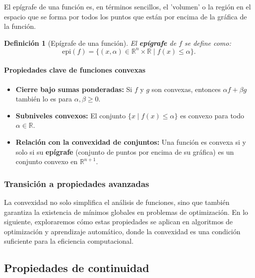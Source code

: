 \documentclass[12pt]{book}
\newtheorem{definition}{Definición}
\theoremstyle{definition}
\theoremstyle{plain}
\theoremstyle{remark}
\begin{document}
El epígrafe de una función es, en términos sencillos, el 'volumen' o la región en el espacio que se forma por todos los puntos que están por encima de la gráfica de la función.

\begin{definition}[Epígrafe de una función]
El \textbf{epígrafe} de \( f \) se define como:
\[
\text{epi}(f) = \{(x, \alpha) \in \mathbb{R}^n \times \mathbb{R} \mid f(x) \leq \alpha\}.
\]
\end{definition}


\paragraph{Propiedades clave de funciones convexas}
\begin{itemize}
    \item \textbf{Cierre bajo sumas ponderadas:} Si \( f \) y \( g \) son convexas, entonces \( \alpha f + \beta g \) también lo es para \( \alpha, \beta \geq 0 \).
    \item \textbf{Subniveles convexos:} El conjunto \( \{x \mid f(x) \leq \alpha\} \) es convexo para todo \( \alpha \in \mathbb{R} \).
    \item \textbf{Relación con la convexidad de conjuntos:} Una función es convexa si y solo si su \textbf{epígrafe} (conjunto de puntos por encima de su gráfica) es un conjunto convexo en \( \mathbb{R}^{n+1} \).
\end{itemize}

\subsubsection{Transición a propiedades avanzadas}
La convexidad no solo simplifica el análisis de funciones, sino que también garantiza la existencia de mínimos globales en problemas de optimización. En lo siguiente, exploraremos cómo estas propiedades se aplican en algoritmos de optimización y aprendizaje automático, donde la convexidad es una condición suficiente para la eficiencia computacional.


\subsection{Propiedades de continuidad} %
\label{subsec:continuidad_funciones_convexas}
\end{document}

